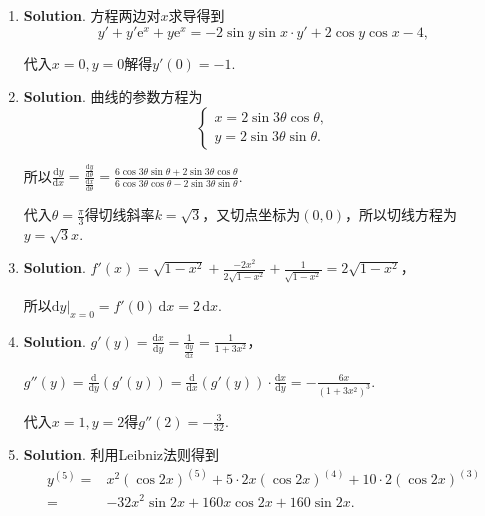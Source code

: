 \documentclass[../Main.tex]{subfiles}
\begin{document}
\begin{enumerate}
          因此有$\begin{cases}
                  a+2b=0, \\
                  a+b=1.
              \end{cases}$ 解得$a=2,b=-1$.

    \item \textbf{Solution}. 方程两边对$x$求导得到
          \[
              y'+y'\mathrm{e}^{x}+y\mathrm{e}^{x}=-2\sin y\sin x\cdot y'+2\cos y\cos x-
              4,
          \]

          代入$x=0,y=0$解得$y'(0)=-1$.

    \item \textbf{Solution}. 曲线的参数方程为
          \[
              \begin{cases}
                  x=2\sin3\theta\cos\theta, \\
                  y=2\sin3\theta\sin\theta.
              \end{cases}
          \]

          所以$\frac{\mathrm{d}y}{\mathrm{d}x}=\frac{\frac{\mathrm{d}y}{\mathrm{d}\theta}}{\frac{\mathrm{d}x}{\mathrm{d}\theta}}
              =\frac{6\cos3\theta\sin\theta+2\sin3\theta\cos\theta}{6\cos3\theta\cos\theta-2\sin3\theta\sin\theta}$.

          代入$\theta=\frac{\pi}{3}$得切线斜率$k=\sqrt{3}$，又切点坐标为$(0,0)$，所以切线方程为$y
              =\sqrt{3}x$.

    \item \textbf{Solution}. $f'(x)=\sqrt{1-x^{2}}+\frac{-2x^{2}}{2\sqrt{1-x^{2}}}
              +\frac{1}{\sqrt{1-x^{2}}}=2\sqrt{1-x^{2}}$，

          所以$\left.\mathrm{d}y\right|_{x=0}=f'(0)\,\mathrm{d}x=2\,\mathrm{d}x$.

    \item \textbf{Solution}. $g'(y)=\frac{\mathrm{d}x}{\mathrm{d}y}=\frac{1}{\frac{\mathrm{d}y}{\mathrm{d}x}}
              =\frac{1}{1+3x^{2}}$，

          $g''(y)=\frac{\mathrm{d}}{\mathrm{d}y}\left(g'(y)\right)=\frac{\mathrm{d}}{\mathrm{d}x}
              \left(g'(y)\right)\cdot\frac{\mathrm{d}x}{\mathrm{d}y}=-\frac{6x}{(1+3x^{2})^{3}}$.

          代入$x=1,y=2$得$g''(2)=-\frac{3}{32}$.

    \item \textbf{Solution}. 利用Leibniz法则得到
          \[
              \begin{aligned}
                  y^{(5)}= & x^{2}\left(\cos 2x\right)^{(5)}+5\cdot 2x\left(\cos 2x\right)^{(4)}+10\cdot 2\left(\cos 2x\right)^{(3)} \\
                  =        & -32x^{2}\sin 2x+160x\cos 2x+160\sin 2x.
              \end{aligned}
          \]


\end{enumerate}
\end{document}
